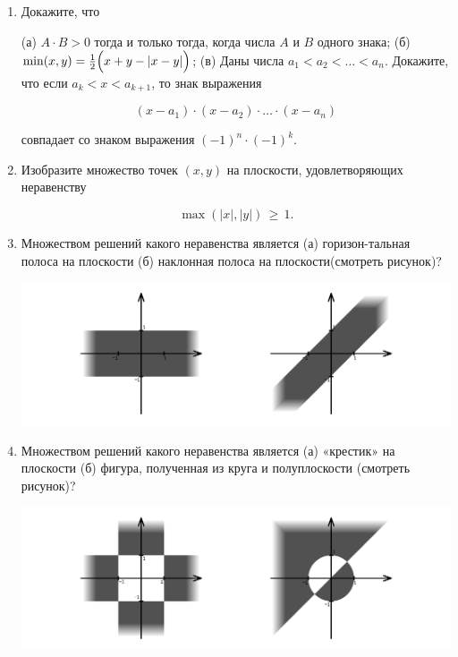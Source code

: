 \begin{enumerate}
\item Докажите, что

\subitem (а) $A \cdot B > 0$ тогда и только тогда, когда числа $A$ и $B$ одного знака;
\subitem (б) $\min (x,y) = \frac{1}{2} \Bigl( x + y - |x - y| \Bigr)$;
\subitem (в) Даны числа $a_1 < a_2 < \ldots < a_n$. Докажите, что если $a_k < x < a_{k+1}$, то знак выражения

\vspace{-0.3cm}
$$(x-a_1)\cdot (x-a_2)\cdot \ldots \cdot (x-a_n)$$

\vspace{-0.15cm}
совпадает со знаком выражения $(-1)^n \cdot (-1)^k$.

\item Изобразите множество точек $(x,y)$ на плоскости, удовлетворяющих неравенству

\vspace{-0.3cm}
$$\max(|x|, |y|)\,\geq\,1.$$

\item Множеством решений какого неравенства является (а) горизон-\linebreak тальная полоса на плоскости (б) наклонная полоса на плоскости\linebreak (смотреть рисунок)?

\centerline{\includegraphics[width=13.75cm]{stats/2018/graph/1}}

\item Множеством решений какого неравенства является (а) «крестик» на плоскости (б) фигура, полученная из круга и полуплоскости (смотреть рисунок)?

\centerline{\includegraphics[width=13.75cm]{stats/2018/graph/2}}


\end{enumerate}
